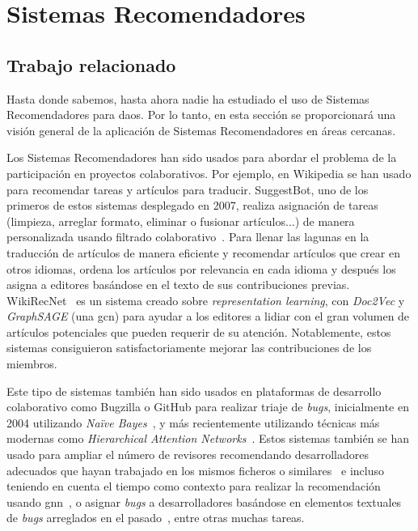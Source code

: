 \chapter{Sistemas Recomendadores}

\section{Trabajo relacionado}

Hasta donde sabemos, hasta ahora nadie ha estudiado el uso de Sistemas Recomendadores para \glspl{dao}. Por lo tanto, en esta sección se proporcionará una visión general de la aplicación de Sistemas Recomendadores en áreas cercanas.

Los Sistemas Recomendadores han sido usados para abordar el problema de la participación en proyectos colaborativos. Por ejemplo, en Wikipedia se han usado para recomendar tareas y artículos para traducir. SuggestBot, uno de los primeros de estos sistemas desplegado en 2007, realiza asignación de tareas (limpieza, arreglar formato, eliminar o fusionar artículos...) de manera personalizada usando filtrado colaborativo~\cite{cosley_suggestbot_2007}. Para llenar las lagunas en la traducción de artículos de manera eficiente y recomendar artículos que crear en otros idiomas, \cite{wulczyn_growing_2016} ordena los artículos por relevancia en cada idioma y después los asigna a editores basándose en el texto de sus contribuciones previas. WikiRecNet~\cite{moskalenko_scalable_2020} es un sistema creado sobre \textit{representation learning}, con \textit{Doc2Vec} y \textit{GraphSAGE} (una \gls{gcn}) para ayudar a los editores a lidiar con el gran volumen de artículos potenciales que pueden requerir de su atención. Notablemente, estos sistemas consiguieron satisfactoriamente mejorar las contribuciones de los miembros. 

Este tipo de sistemas también han sido usados en plataformas de desarrollo colaborativo como Bugzilla o GitHub para realizar triaje de \textit{bugs}, inicialmente en 2004 utilizando \textit{Naïve Bayes}~\cite{cubranic_automatic_2004}, y más recientemente utilizando técnicas más modernas como \textit{Hierarchical Attention Networks}~\cite{he_automatic_2021}. Estos sistemas también se han usado para ampliar el número de revisores recomendando desarrolladores adecuados que hayan trabajado en los mismos ficheros o similares~\cite{strand_using_2020,chueshev_expanding_2020,constantino_dual_2023} e incluso teniendo en cuenta el tiempo como contexto para realizar la recomendación usando \gls{gnn}~\cite{xie_time-series_2022}, o asignar \textit{bugs} a desarrolladores basándose en elementos textuales de \textit{bugs} arreglados en el pasado~\cite{sajedi-badashian_vocabulary_2020,diamantopoulos_automated_2023}, entre otras muchas tareas.

